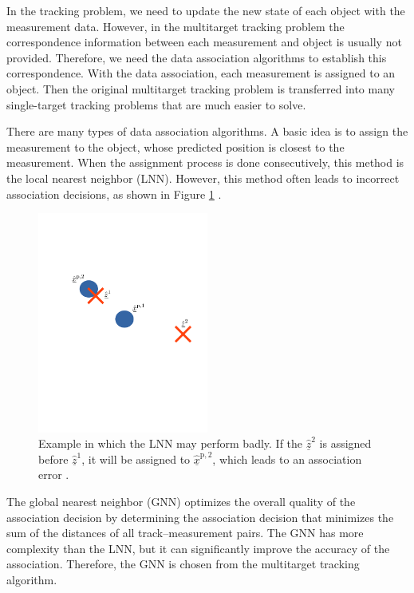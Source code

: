 
In the tracking problem, we need to update the new state of each object with the measurement data. However, in the multitarget tracking problem the correspondence information between each measurement and object is usually not provided. Therefore, we need the data association algorithms to establish this correspondence. With the data association, each measurement is assigned to an object. Then the original multitarget tracking problem is transferred into many single-target tracking problems that are much easier to solve.

There are many types of data association algorithms. A basic idea is to assign the measurement to the object, whose predicted position is closest to the measurement. When the assignment process is done consecutively, this method is the local nearest neighbor (LNN). However, this method often leads to incorrect association decisions, as shown in Figure \ref{lnn} \cite{pfaff2019multitarget}.

\begin{figure}[htbp]
\centering
\includegraphics[width=0.5\textwidth]{figures/LNN.pdf}
\caption{Example in which the LNN may perform badly. If the $\hat{\underline{z}}^{2}$ is assigned before $\hat{\underline{z}}^{1}$, it will be assigned to $\hat{\underline{x}}^{\mathrm{p},2}$, which leads to an association error \cite{pfaff2019multitarget}.}
\label{lnn}
\end{figure}

The global nearest neighbor (GNN) optimizes the overall quality of the association decision by determining the association decision that minimizes the sum of the distances of all track–measurement pairs. 
The GNN has more complexity than the LNN, but it can significantly improve the accuracy of the association. Therefore, the GNN is chosen from the multitarget tracking algorithm. 

